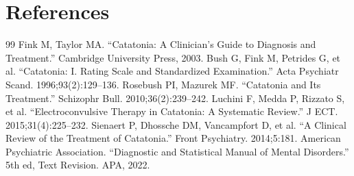 \section*{References}
\begin{thebibliography}{99}
 Fink M, Taylor MA. ``Catatonia: A Clinician's Guide to Diagnosis and Treatment.'' Cambridge University Press, 2003.
 Bush G, Fink M, Petrides G, et al. ``Catatonia: I. Rating Scale and Standardized Examination.'' Acta Psychiatr Scand. 1996;93(2):129--136.
 Rosebush PI, Mazurek MF. ``Catatonia and Its Treatment.'' Schizophr Bull. 2010;36(2):239--242.
 Luchini F, Medda P, Rizzato S, et al. ``Electroconvulsive Therapy in Catatonia: A Systematic Review.'' J ECT. 2015;31(4):225--232.
 Sienaert P, Dhossche DM, Vancampfort D, et al. ``A Clinical Review of the Treatment of Catatonia.'' Front Psychiatry. 2014;5:181.
 American Psychiatric Association. ``Diagnostic and Statistical Manual of Mental Disorders.'' 5th ed, Text Revision. APA, 2022.
\end{thebibliography}
